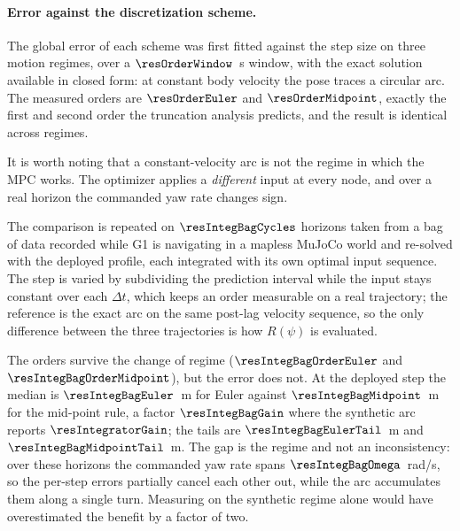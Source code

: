 \documentclass[11pt,a4paper]{article}
\begin{document}
\paragraph{Error against the discretization scheme.} The global error of each scheme was first fitted against the step size
on three motion regimes, over a $\resOrderWindow$~s window, with the exact solution available in closed form:
at constant body velocity the pose traces a circular arc. The measured orders are $\resOrderEuler$ and
$\resOrderMidpoint$, exactly the first and second order the truncation analysis predicts, and the result is
identical across regimes.

It is worth noting that a constant-velocity
arc is not the regime in which the MPC works. The optimizer applies a \emph{different} input at every node, and over a real horizon the commanded yaw rate changes sign.

The comparison is repeated on
$\resIntegBagCycles$ horizons taken from a bag of data recorded while G1 is navigating in a mapless MuJoCo world and re-solved with the deployed
profile, each integrated with its own optimal input sequence. The step is varied by subdividing the
prediction interval while the input stays constant over each $\Delta t$, which keeps an order measurable on a
real trajectory; the reference is the exact arc on the same post-lag velocity sequence, so the only
difference between the three trajectories is how $R(\psi)$ is evaluated.

\begin{table}[htbp]
  \centering
  \small
  \caption{%
  Median position error at the end of the horizon, over 12 horizons re-solved from a bag of data recorded during the navigation, against the exact arc on the same velocity sequence. The first row is the
  deployed step; the others subdivide the prediction interval without changing the input.}
  \label{res:tab:integbag}
\end{table}

The orders survive the change of regime ($\resIntegBagOrderEuler$ and $\resIntegBagOrderMidpoint$), but
the error does not. At the deployed step the median is $\resIntegBagEuler$~m for Euler against
$\resIntegBagMidpoint$~m for the mid-point rule, a factor $\resIntegBagGain$ where the synthetic arc reports
$\resIntegratorGain$; the tails are $\resIntegBagEulerTail$~m and $\resIntegBagMidpointTail$~m. The gap is
the regime and not an inconsistency: over these horizons the commanded yaw rate spans
$\resIntegBagOmega$~rad/s, so the per-step errors partially cancel each other out, while the arc accumulates them along a
single turn. Measuring on the synthetic regime alone would have overestimated the benefit by a factor of two.
\end{document}
